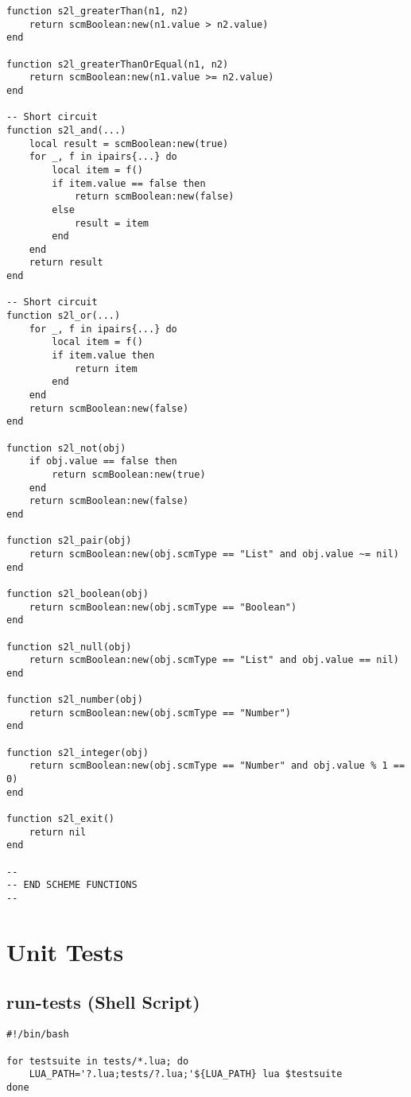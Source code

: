 \begin{verbatim}
function s2l_greaterThan(n1, n2)
    return scmBoolean:new(n1.value > n2.value)
end

function s2l_greaterThanOrEqual(n1, n2)
    return scmBoolean:new(n1.value >= n2.value)
end

-- Short circuit
function s2l_and(...)
    local result = scmBoolean:new(true)
    for _, f in ipairs{...} do
        local item = f()
        if item.value == false then
            return scmBoolean:new(false)
        else
            result = item
        end
    end
    return result
end

-- Short circuit
function s2l_or(...)
    for _, f in ipairs{...} do
        local item = f()
        if item.value then
            return item
        end
    end
    return scmBoolean:new(false)
end

function s2l_not(obj)
    if obj.value == false then
        return scmBoolean:new(true)
    end
    return scmBoolean:new(false)
end

function s2l_pair(obj)
    return scmBoolean:new(obj.scmType == "List" and obj.value ~= nil)
end

function s2l_boolean(obj)
    return scmBoolean:new(obj.scmType == "Boolean")
end

function s2l_null(obj)
    return scmBoolean:new(obj.scmType == "List" and obj.value == nil)
end

function s2l_number(obj)
    return scmBoolean:new(obj.scmType == "Number")
end

function s2l_integer(obj)
    return scmBoolean:new(obj.scmType == "Number" and obj.value % 1 == 0)
end

function s2l_exit()
    return nil
end

--
-- END SCHEME FUNCTIONS
--
\end{verbatim}


\section{Unit Tests}
\subsection{run-tests (Shell Script)}
\begin{verbatim}
#!/bin/bash

for testsuite in tests/*.lua; do
    LUA_PATH='?.lua;tests/?.lua;'${LUA_PATH} lua $testsuite
done
\end{verbatim}

